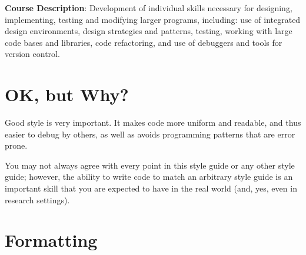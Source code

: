 \newlecture

\textbf{Course Description}: Development of individual skills necessary for
designing, implementing, testing and modifying larger programs, including: use
of integrated design environments, design strategies and patterns, testing,
working with large code bases and libraries, code refactoring, and use of
debuggers and tools for version control.

\section{OK, but Why?}

Good style is very important. It makes code more uniform and readable, and thus
easier to debug by others, as well as avoids programming patterns that are error
prone.
\par
You may not always agree with every point in this style guide or any other style
guide; however, the ability to write code to match an arbitrary style guide is
an important skill that you are expected to have in the real world (and, yes, even
in research settings).

\section{Formatting}

